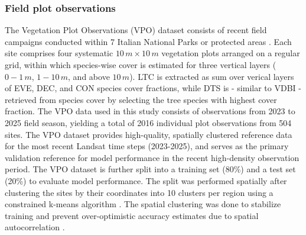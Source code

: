 \documentclass[essd, manuscript]{copernicus}
\begin{document}
\subsubsection{Field plot observations}
\label{sec:vpo}
The Vegetation Plot Observations (VPO) dataset consists of recent field campaigns conducted within 7 Italian National Parks or protected areas \citep{hiebl_advancing_2025,hiebl_combining_2026}. Each site comprises four systematic $10\,\unit{m} \times 10\,\unit{m}$ vegetation plots arranged on a regular grid, within which species-wise cover is estimated for three vertical layers ($0-1\,\unit{m}$, $1-10\,\unit{m}$, and above $10\,\unit{m}$). LTC is extracted as sum over verical layers of EVE, DEC, and CON species cover fractions, while DTS is - similar to VDBI - retrieved from species cover by selecting the tree species with highest cover fraction. The VPO data used in this study consists of observations from 2023 to 2025 field season, yielding a total of 2016 individual plot observations from 504 sites. The VPO dataset provides high-quality, spatially clustered reference data for the most recent Landsat time steps (2023-2025), and serves as the primary validation reference for model performance in the recent high-density observation period. The VPO dataset is further split into a training set (80\%) and a test set (20\%) to evaluate model performance. The split was performed spatially after clustering the sites by their coordinates into 10 clusters per region using a constrained k-means algorithm \citep{bradley2000constrained}. The spatial clustering was done to stabilize training and prevent over-optimistic accuracy estimates due to spatial autocorrelation \citep{safonova_ten_2023, hiebl_advancing_2025}.
\end{document}
